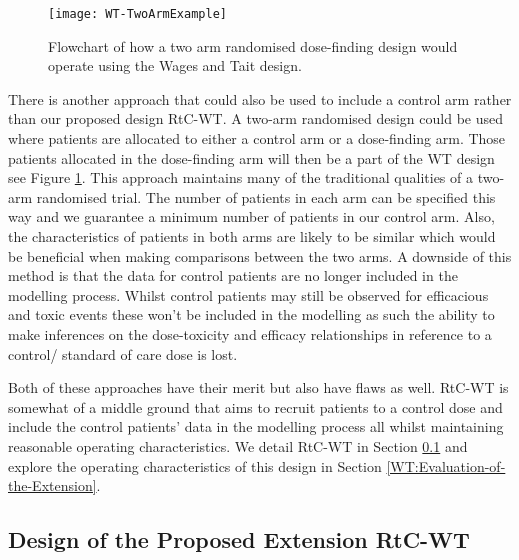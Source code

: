\begin{figure}[!h]
	\centering
	\caption[Flowchart of a two arm randomised dose-finding trial.]{Flowchart of how a two arm randomised dose-finding design would operate using the Wages and Tait design.}
	\label{fig_wt:TwoArmExample}
	\texttt{[image: WT-TwoArmExample]}
\end{figure}

There is another approach that could also be used to include a control arm rather than our proposed design RtC-WT. A two-arm randomised design could be used where patients are allocated to either a control arm or a dose-finding arm. Those patients allocated in the dose-finding arm will then be a part of the WT design see Figure \ref{fig_wt:TwoArmExample}. This approach maintains many of the traditional qualities of a two-arm randomised trial. The number of patients in each arm can be specified this way and we guarantee a minimum number of patients in our control arm. Also, the characteristics of patients in both arms are likely to be similar which would be beneficial when making comparisons between the two arms. A downside of this method is that the data for control patients are no longer included in the modelling process. Whilst control patients may still be observed for efficacious and toxic events these won't be included in the modelling as such the ability to make inferences on the dose-toxicity and efficacy relationships in reference to a control/ standard of care dose is lost. 

Both of these approaches have their merit but also have flaws as well. RtC-WT is somewhat of a middle ground that aims to recruit patients to a control dose and include the control patients' data in the modelling process all whilst maintaining reasonable operating characteristics. We detail RtC-WT in Section \ref{WT:Design-RtC-WT} and explore the operating characteristics of this design in Section \ref{WT:Evaluation-of-the-Extension}.

\subsection{Design of the Proposed Extension RtC-WT}
\label{WT:Design-RtC-WT}

